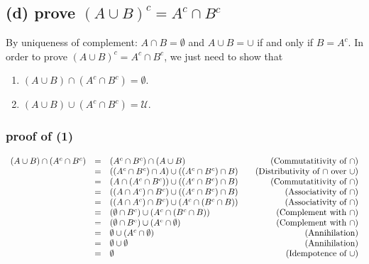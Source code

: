 \documentclass[]{article}
\begin{document}
\begin{spacing}{1.5}
\subsection*{(d) prove $ (A \cup B)^{c} = A^c \cap B^c $}

By uniqueness of complement: $ A \cap B=\emptyset $ and $ A \cup B=\cup $ if and only if $ B=A^{c} $. In order to  prove $ (A \cup B)^{c} = A^c \cap B^c $, we just need to show that 
\begin{enumerate}[(1)]
	\item  $ (A \cup B) \cap (A^c \cap B^c) = \emptyset $.
	\item  $ (A \cup B) \cup (A^c \cap B^c) = \mathcal{U} $.
\end{enumerate}
\subsubsection*{proof of (1)}
\[\begin{array}{rclr}
	 (A \cup B) \cap (A^c \cap B^c) &=& (A^c \cap B^c) \cap (A \cup B)&\quad\text{(Commutatitivity of  $\cap$)}\\
	&=& ((A^c \cap B^c) \cap A) \cup ((A^c \cap B^c) \cap B) &\quad\text{(Distributivity of $ \cap $ over $ \cup $)}\\
	&=& (A \cap (A^c \cap B^c)) \cup ((A^c \cap B^c) \cap B) &\quad\text{(Commutatitivity of $ \cap $)}\\
	&=& ((A \cap A^c) \cap B^c) \cup ((A^c \cap B^c) \cap B) &\quad\text{(Associativity of $ \cap $)}\\
	&=& ((A \cap A^c) \cap B^c) \cup (A^c \cap (B^c \cap B)) &\quad\text{(Associativity of $ \cap $)}\\
	&=& (\emptyset \cap B^c) \cup (A^c \cap (B^c \cap B)) &\quad\text{(Complement with $ \cap $)}\\
	&=& (\emptyset \cap B^c) \cup (A^c \cap \emptyset) &\quad\text{(Complement with $ \cap $)}\\
	&=& \emptyset \cup (A^c \cap \emptyset) &\quad\text{(Annihilation)}\\
	&=& \emptyset \cup \emptyset &\quad\text{(Annihilation)}\\
	&=& \emptyset &\quad\text{(Idempotence of $ \cup $)}
\end{array}\]

\end{spacing}
\end{document}
